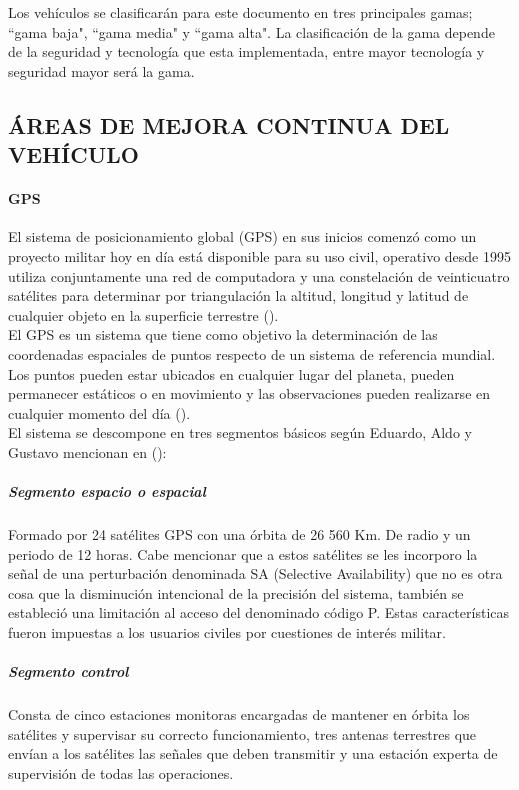 Los vehículos se clasificarán para este documento en tres principales gamas; ``gama baja", ``gama media" y ``gama alta". La clasificación de la gama depende de la seguridad y tecnología que esta implementada, entre mayor tecnología y seguridad mayor será la gama.\\


\subsection{ÁREAS DE MEJORA CONTINUA DEL VEHÍCULO}

\paragraph{GPS}

El sistema de posicionamiento global (GPS) en sus inicios comenzó como un proyecto militar hoy en día está disponible para su uso civil, operativo desde 1995 utiliza conjuntamente una red de computadora y una constelación de veinticuatro satélites para determinar por triangulación la altitud, longitud y latitud de cualquier objeto en la superficie terrestre (\cite{MT-13}).\\

El GPS es un sistema que tiene como objetivo la determinación de las coordenadas espaciales de puntos respecto de un sistema de referencia mundial. Los puntos pueden estar ubicados en cualquier lugar del planeta, pueden permanecer estáticos o en movimiento y las observaciones pueden realizarse en cualquier momento del día (\cite{MT-13}).\\

El sistema se descompone en tres segmentos básicos según Eduardo, Aldo y Gustavo mencionan en (\cite{MT-14}):

\subparagraph{Segmento espacio o espacial}

Formado por 24 satélites GPS con una órbita de 26 560 Km. De radio y un periodo de 12 horas. Cabe mencionar que a estos satélites se les incorporo la señal de una perturbación denominada SA (Selective Availability) que no es otra cosa que la disminución intencional de la precisión del sistema, también se estableció una limitación al acceso del denominado código P. Estas características fueron impuestas a los usuarios civiles por cuestiones de interés militar.


\subparagraph{Segmento control}

Consta de cinco estaciones monitoras encargadas de mantener en órbita los satélites y supervisar su correcto funcionamiento, tres antenas terrestres que envían a los satélites las señales que deben transmitir y una estación experta de supervisión de todas las operaciones.\\

